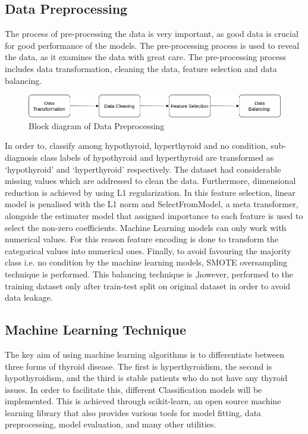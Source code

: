 \subsection{Data Preprocessing}
The process of pre-processing the data is very important, as good data is crucial for good performance of the models. The pre-processing process is used to reveal the data, as it examines the data with great care. The pre-processing process includes data transformation, cleaning the data, feature selection and data balancing.\\
\begin{figure}[h]
\centering
\includegraphics[scale=0.5]{process.jpg}
\caption{Block diagram of Data Preprocessing}
\end{figure}
\par In order to, classify among hypothyroid, hyperthyroid and no condition, sub-diagnosis class labels of hypothyroid and hyperthyroid are transformed as `hypothyroid' and `hyperthyroid' respectively. The dataset had considerable missing values which are addressed to clean the data. Furthermore, dimensional reduction is achieved by using L1 regularization. In this feature selection, linear model is penalised with the L1 norm and SelectFromModel, a meta transformer, alongside the estimater model that assigned importance to each feature is used to select the non-zero coefficients. Machine Learning models can only work with numerical values. For this reason feature encoding is done to transform the categorical values into numerical ones. Finally, to avoid favouring the majority class i.e. no condition by the machine learning models, SMOTE oversampling technique is performed. This balancing technique is ,however, performed to the training dataset only after train-test split on original dataset in order to avoid data leakage.
\subsection{Machine Learning Technique}
The key aim of using machine learning algorithms is to differentiate between three forms of thyroid disease. The first is hyperthyroidism, the second is hypothyroidism, and the third is stable patients who do not have any thyroid issues. In order to facilitate this, different Classification models will be implemented. This is achieved through scikit-learn, an open source machine learning library that also provides various tools for model fitting, data preprocessing, model evaluation, and many other utilities.
